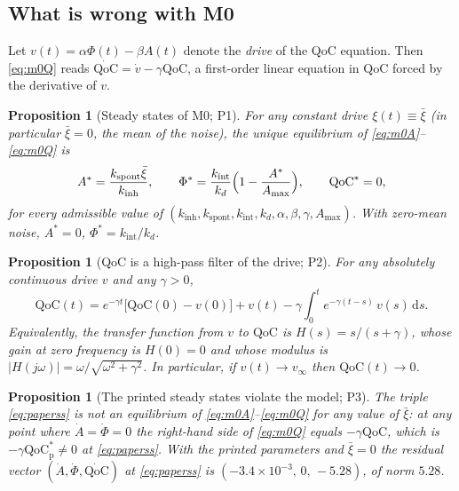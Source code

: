 \documentclass[12pt,a4paper]{article}
\theoremstyle{plain}
\newtheorem{proposition}[theorem]{Proposition}
\theoremstyle{definition}
\theoremstyle{remark}
\newcommand{\QoC}{\mathrm{QoC}}
\newcommand{\kinh}{k_{\mathrm{inh}}}
\newcommand{\kint}{k_{\mathrm{int}}}
\newcommand{\kd}{k_{d}}
\newcommand{\kspont}{k_{\mathrm{spont}}}
\newcommand{\Amax}{A_{\max}}
\renewcommand{\dd}{\,\mathrm{d}}   %
\begin{document}
\subsection{What is wrong with M0}
\label{sec:m0wrong}

Let $v(t)=\alpha\Phi(t)-\beta A(t)$ denote the \emph{drive} of the QoC equation. Then \eqref{eq:m0Q} reads $\dot{\QoC}=\dot v-\gamma\QoC$, a first-order linear equation in $\QoC$ forced by the derivative of $v$.

\begin{proposition}[Steady states of M0; P1]
\label{prop:p1}
For any constant drive $\xi(t)\equiv\bar\xi$ (in particular $\bar\xi=0$, the mean of the noise), the unique equilibrium of \eqref{eq:m0A}--\eqref{eq:m0Q} is
\begin{equation}
  A^*=\frac{\kspont\bar\xi}{\kinh},\qquad \Phi^*=\frac{\kint}{\kd}\Bigl(1-\frac{A^*}{\Amax}\Bigr),\qquad \QoC^*=0,
  \label{eq:m0ss}
\end{equation}
for every admissible value of $(\kinh,\kspont,\kint,\kd,\alpha,\beta,\gamma,\Amax)$. With zero-mean noise, $A^*=0$, $\Phi^*=\kint/\kd$.
\end{proposition}

\begin{proposition}[QoC is a high-pass filter of the drive; P2]
\label{prop:p2}
For any absolutely continuous drive $v$ and any $\gamma>0$,
\begin{equation}
  \QoC(t)=e^{-\gamma t}\bigl[\QoC(0)-v(0)\bigr]+v(t)-\gamma\int_0^t e^{-\gamma(t-s)}\,v(s)\dd s .
  \label{eq:qocsol}
\end{equation}
Equivalently, the transfer function from $v$ to $\QoC$ is $H(s)=s/(s+\gamma)$, whose gain at zero frequency is $H(0)=0$ and whose modulus is $|H(j\omega)|=\omega/\sqrt{\omega^2+\gamma^2}$. In particular, if $v(t)\to v_\infty$ then $\QoC(t)\to 0$.
\end{proposition}

\begin{proposition}[The printed steady states violate the model; P3]
\label{prop:p3}
The triple \eqref{eq:paperss} is not an equilibrium of \eqref{eq:m0A}--\eqref{eq:m0Q} for any value of $\bar\xi$: at any point where $\dot A=\dot\Phi=0$ the right-hand side of \eqref{eq:m0Q} equals $-\gamma\QoC$, which is $-\gamma\QoC^*_{\mathrm p}\neq 0$ at \eqref{eq:paperss}. With the printed parameters and $\bar\xi=0$ the residual vector $(\dot A,\dot\Phi,\dot{\QoC})$ at \eqref{eq:paperss} is $(-3.4\times10^{-3},\,0,\,-5.28)$, of norm $5.28$.
\end{proposition}
\end{document}
